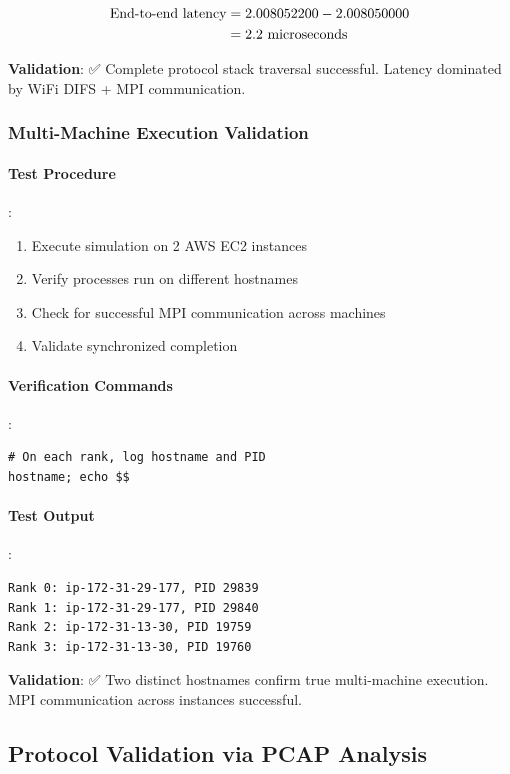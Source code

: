 \begin{align}
\text{End-to-end latency} &= 2.008052200 - 2.008050000 \notag \\
&= 2.2 \text{ microseconds}
\end{align}

\textbf{Validation}: ✅ Complete protocol stack traversal successful. Latency dominated by WiFi DIFS + MPI communication.

\subsubsection{Multi-Machine Execution Validation}

\paragraph{Test Procedure}:
\begin{enumerate}
    \item Execute simulation on 2 AWS EC2 instances
    \item Verify processes run on different hostnames
    \item Check for successful MPI communication across machines
    \item Validate synchronized completion
\end{enumerate}

\paragraph{Verification Commands}:
\begin{lstlisting}[style=bash]
# On each rank, log hostname and PID
hostname; echo $$
\end{lstlisting}

\paragraph{Test Output}:
\begin{verbatim}
Rank 0: ip-172-31-29-177, PID 29839
Rank 1: ip-172-31-29-177, PID 29840
Rank 2: ip-172-31-13-30, PID 19759
Rank 3: ip-172-31-13-30, PID 19760
\end{verbatim}

\textbf{Validation}: ✅ Two distinct hostnames confirm true multi-machine execution. MPI communication across instances successful.

\subsection{Protocol Validation via PCAP Analysis}

